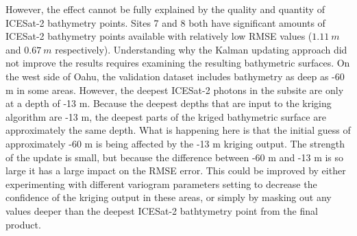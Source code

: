 However, the effect cannot be fully explained by the quality and quantity of ICESat-2 bathymetry points. Sites 7 and 8 both have significant amounts of ICESat-2 bathymetry points available with relatively low RMSE values ($1.11~m$ and $0.67~m$ respectively). Understanding why the Kalman updating approach did not improve the results requires examining the resulting bathymetric surfaces. On the west side of Oahu, the validation dataset includes bathymetry as deep as -60 m in some areas. However, the deepest ICESat-2 photons in the subsite are only at a depth of -13 m. Because the deepest depths that are input to the kriging algorithm are -13 m, the deepest parts of the kriged bathymetric surface are approximately the same depth. What is happening here is that the initial guess of approximately -60 m is being affected by the -13 m kriging output. The strength of the update is small, but because the difference between -60 m and -13 m is so large it has a large impact on the RMSE error. This could be improved by either experimenting with different variogram parameters setting to decrease the confidence of the kriging output in these areas, or simply by masking out any values deeper than the deepest ICESat-2 bathtymetry point from the final product.

\begin{figure}
    \begin{floatrow}
    \end{floatrow}
\end{figure}



